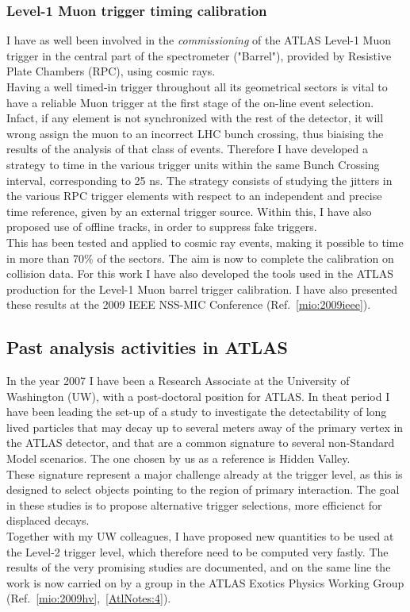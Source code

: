 \documentclass{article}
\begin{document}
\begin{vita}
\subsubsection*{Level-1 Muon trigger timing calibration}
I have as well been involved in the {\it commissioning} 
of the ATLAS Level-1 Muon trigger in the central part of the spectrometer ("Barrel"), provided by 
Resistive Plate Chambers (RPC), using cosmic rays. \\
Having a well timed-in trigger throughout all its geometrical sectors is vital to have a reliable Muon trigger at 
the first stage of the on-line event selection. Infact, if any element is not synchronized with the rest of the 
detector, it will wrong assign the muon to an incorrect LHC bunch crossing, thus biaising the results of the
analysis of that class of events. Therefore I have developed a strategy to time in the various trigger units within 
the same Bunch Crossing interval, corresponding to 25 ns. 
The strategy consists of studying the jitters in the various RPC trigger elements with respect 
to an independent and precise time reference, given by an external trigger source. Within this, I have also proposed use
 of offline tracks, in order to suppress fake triggers. \\ 
This has been tested and applied to 
cosmic ray events, making it possible to time in more than 70$\%$ of the sectors. The aim is now to complete the calibration 
on collision data. For this work I have also developed the tools used in the ATLAS production for the Level-1 Muon barrel trigger
calibration. 
I have also presented these results at the 2009 IEEE NSS-MIC Conference (Ref.~\ref{mio:2009ieee}).

\subsection*{Past analysis activities in ATLAS}
In the year 2007 I have been a Research Associate at the University of Washington (UW), with a post-doctoral position for ATLAS.
In theat period I have been leading the set-up of a study to investigate the detectability of long lived particles that may decay up to several meters away of the primary vertex in the ATLAS detector, and that are a common signature to several non-Standard Model scenarios. The one chosen by us as a reference is Hidden Valley. \\
These signature represent a major challenge already at the trigger level, as this is designed to select objects pointing to the region of primary interaction. The goal in these studies is to propose alternative trigger selections, more efficienct for displaced decays. \\
Together with my UW colleagues, I have proposed new quantities to be used at the Level-2 trigger level, which therefore need to be computed very fastly. The results of the very promising studies are documented, and on the same line the work is now carried on by a group in the ATLAS Exotics Physics Working Group (Ref.~\ref{mio:2009hv},~\ref{AtlNotes:4}). 


\end{vita}
\end{document}
